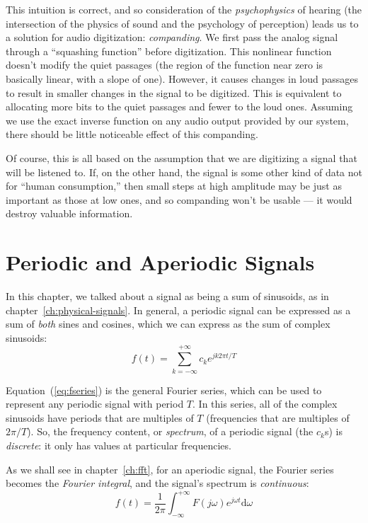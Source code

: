 This intuition is correct, and so consideration of the
\emph{psychophysics} of hearing (the intersection of the physics of
sound and the psychology of perception) leads us to a solution for
audio digitization: \emph{companding}. 
We first pass the analog signal through a ``squashing function''
before digitization. This nonlinear function doesn't modify the quiet
passages (the region of the function near zero is basically linear,
with a slope of one).  However, it causes changes in loud passages to
result in smaller changes in the signal to be digitized. This is
equivalent to allocating more bits to the quiet passages and fewer to
the loud ones. Assuming we use the exact inverse function on any audio
output provided by our system, there should be little noticeable
effect of this companding.

Of course, this is all based on the assumption that we are digitizing
a signal that will be listened to. If, on the other hand, the signal
is some other kind of data not for ``human consumption,'' then small
steps at high amplitude may be just as important as those at low ones,
and so companding won't be usable --- it would destroy valuable
information.

\section{Periodic and Aperiodic Signals}

In this chapter, we talked about a signal as being a sum of sinusoids,
as in chapter~\ref{ch:physical-signals}. In general, a periodic
signal can be expressed as a sum of \emph{both} sines and cosines,
which we can express as the sum of complex sinusoids:
\begin{equation}
f(t) = \sum_{k=-\infty}^{+\infty} c_k e^{jk 2\pi t/T}
\label{eq:fseries}
\end{equation}

Equation~(\ref{eq:fseries}) is the general Fourier series, which can
be used to represent any periodic signal with period $T$. In this
series, all of the complex sinusoids have periods that are multiples
of $T$ (frequencies that are multiples of $2\pi/T$). So, the frequency
content, or \emph{spectrum}, of a periodic signal (the $c_k$s) is
\emph{discrete}: it only has values at particular frequencies.

As we shall see in chapter~\ref{ch:fft}, for an aperiodic signal, the
Fourier series becomes the \emph{Fourier integral}, and the signal's
spectrum is \emph{continuous}:
\begin{equation}
f(t) = \frac{1}{2\pi} \int_{-\infty}^{+\infty} F(j\omega)
                          e^{j\omega t} \mathrm{d}\omega
\label{eq:fint}
\end{equation}

